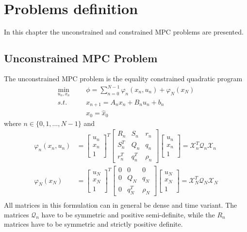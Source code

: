 \documentclass[a4paper]{report}
\begin{document}
\chapter{Problems definition}

In this chapter the unconstrained and constrained MPC problems are presented.

\section{Unconstrained MPC Problem}

The unconstrained MPC problem is the equality constrained quadratic program
\begin{equation}
\begin{aligned}
\min_{u_n,x_n} &&& \phi = \sum_{n=0}^{N-1} \varphi_n(x_n,u_n) + \varphi_N(x_N) \\
s.t. &&& x_{n+1} = A_nx_n+B_nu_n+b_n \\
&&& x_0 = \hat x_0
\end{aligned}
\label{lqcp}
\end{equation}
where $n\in\{0,1,\dots,N-1\}$ and
\begin{equation}
\begin{aligned}
\varphi_n(x_n,u_n) &= \begin{bmatrix} u_n \\ x_n \\ 1 \end{bmatrix}^T \begin{bmatrix} R_n&S_n&r_n \\ S_n^T&Q_n&q_n \\ r_n^T&q_n^T& \rho_n \end{bmatrix} \begin{bmatrix} u_n \\ x_n \\ 1 \end{bmatrix}  = \mathcal{X}^T_n\mathcal{Q}_n\mathcal{X}_n \\
\varphi_N(x_N) &= \begin{bmatrix} u_N \\ x_N \\ 1 \end{bmatrix}^T \begin{bmatrix} 0&0&0 \\ 0&Q_N&q_N \\ 0&q_N^T&\rho_N \end{bmatrix} \begin{bmatrix} u_N \\ x_N \\ 1 \end{bmatrix} = \mathcal{X}^T_N\mathcal{Q}_N\mathcal{X}_N\\ 
\end{aligned}
\label{eq:cf_mpc}
\end{equation}
All matrices in this formulation can in general be dense and time variant. 
The matrices $\mathcal Q_n$ have to be symmetric and positive semi-definite, while the $R_n$ matrices have to be symmetric and strictly positive definite.
\end{document}
